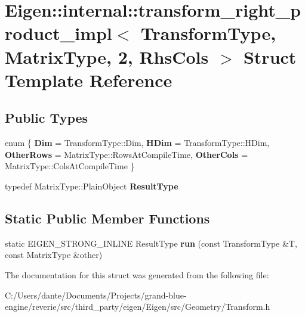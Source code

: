 \hypertarget{struct_eigen_1_1internal_1_1transform__right__product__impl_3_01_transform_type_00_01_matrix_type_00_012_00_01_rhs_cols_01_4}{}\section{Eigen\+::internal\+::transform\+\_\+right\+\_\+product\+\_\+impl$<$ Transform\+Type, Matrix\+Type, 2, Rhs\+Cols $>$ Struct Template Reference}
\label{struct_eigen_1_1internal_1_1transform__right__product__impl_3_01_transform_type_00_01_matrix_type_00_012_00_01_rhs_cols_01_4}
\subsection*{Public Types}
\begin{DoxyCompactItemize}
\item 
\mbox{\label{struct_eigen_1_1internal_1_1transform__right__product__impl_3_01_transform_type_00_01_matrix_type_00_012_00_01_rhs_cols_01_4_ab9f285e40dcddff4f558730d65e51ec9}} 
enum \{ {\bfseries Dim} = Transform\+Type\+::Dim, 
{\bfseries H\+Dim} = Transform\+Type\+::H\+Dim, 
{\bfseries Other\+Rows} = Matrix\+Type\+::Rows\+At\+Compile\+Time, 
{\bfseries Other\+Cols} = Matrix\+Type\+::Cols\+At\+Compile\+Time
 \}
\item 
\mbox{\label{struct_eigen_1_1internal_1_1transform__right__product__impl_3_01_transform_type_00_01_matrix_type_00_012_00_01_rhs_cols_01_4_adfedcd76ea23ad81698c0e50b6db04e2}} 
typedef Matrix\+Type\+::\+Plain\+Object {\bfseries Result\+Type}
\end{DoxyCompactItemize}
\subsection*{Static Public Member Functions}
\begin{DoxyCompactItemize}
\item 
\mbox{\label{struct_eigen_1_1internal_1_1transform__right__product__impl_3_01_transform_type_00_01_matrix_type_00_012_00_01_rhs_cols_01_4_af28512e23bf6a5bb85f2edcb2cd5d793}} 
static E\+I\+G\+E\+N\+\_\+\+S\+T\+R\+O\+N\+G\+\_\+\+I\+N\+L\+I\+NE Result\+Type {\bfseries run} (const Transform\+Type \&T, const Matrix\+Type \&other)
\end{DoxyCompactItemize}


The documentation for this struct was generated from the following file\+:\begin{DoxyCompactItemize}
\item 
C\+:/\+Users/dante/\+Documents/\+Projects/grand-\/blue-\/engine/reverie/src/third\+\_\+party/eigen/\+Eigen/src/\+Geometry/Transform.\+h\end{DoxyCompactItemize}
